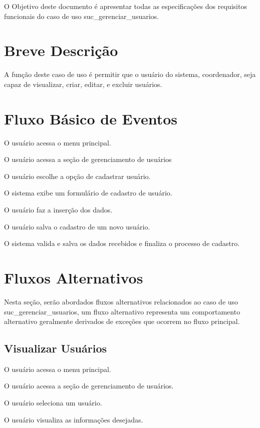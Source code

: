 \documentclass[12pt,letterpaper]{article}
\newcommand{\ucnome}{suc\_\allowbreak gerenciar\_\allowbreak usuarios}
\newlength{\recuo}
\newcommand{\corpo}{\setlength{\leftskip}{\recuo}}
\begin{document}
\corpo

O Objetivo deste documento é apresentar todas as especificações dos requisitos
funcionais do caso de uso \ucnome.

\section{Breve Descrição}

A função deste caso de uso é permitir que o usuário do sistema, coordenador,
seja capaz de visualizar, criar, editar, e excluir usuários.

\section{Fluxo Básico de Eventos}

\begin{fluxo}
  \item O usuário acessa o menu principal.
  \item O usuário acessa a seção de gerenciamento de usuários
  \item O usuário escolhe a opção de cadastrar usuário.
  \item O sistema exibe um formulário de cadastro de usuário.
  \item O usuário faz a inserção dos dados.
  \item O usuário salva o cadastro de um novo usuário.
  \item O sistema valida e salva os dados recebidos e finaliza o processo de
        cadastro.
\end{fluxo}

\section{Fluxos Alternativos}

Nesta seção, serão abordados fluxos alternativos relacionados ao caso de uso
\ucnome, um fluxo alternativo representa um comportamento alternativo
geralmente derivados de exceções que ocorrem no fluxo principal.

\subsection{Visualizar Usuários}

\begin{fluxo}
  \item O usuário acessa o menu principal.
  \item O usuário acessa a seção de gerenciamento de usuários.
  \item O usuário seleciona um usuário.
  \item O usuário visualiza as informações desejadas.
\end{fluxo}
\end{document}
